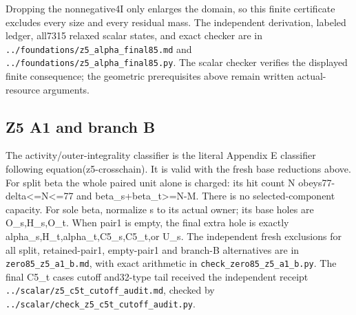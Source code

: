 \documentclass[10pt,a4paper]{article}
\theoremstyle{definition}
\begin{document}
Dropping the nonnegative4I only enlarges the domain,\allowbreak{} so this finite
certificate excludes every size and every residual mass. The independent
derivation,\allowbreak{} labeled ledger,\allowbreak{} all7315 relaxed scalar states,\allowbreak{} and exact
checker are in
\texttt{../\allowbreak{}foundations/\allowbreak{}z5\_\allowbreak{}\allowbreak{}alpha\_\allowbreak{}\allowbreak{}final85.md} and
\texttt{../\allowbreak{}foundations/\allowbreak{}z5\_\allowbreak{}\allowbreak{}alpha\_\allowbreak{}\allowbreak{}final85.py}. The
scalar checker verifies the displayed finite consequence; the geometric
prerequisites above remain written actual-resource arguments.

\hypertarget{z5-a1-and-branch-b}{%
\subsection{Z5 A1 and branch B}\label{z5-a1-and-branch-b}}

The activity/outer-integrality classifier is the literal Appendix E
classifier following equation(z5-crosschain). It is valid with the fresh
base reductions above. For split beta the whole paired unit alone is
charged: its hit count N obeys77-delta\textless=\allowbreak{}N\textless=\allowbreak{}77 and
beta\_\allowbreak{}s+\allowbreak{}beta\_\allowbreak{}t\textgreater=\allowbreak{}N-M. There is no selected-component
capacity. For sole beta,\allowbreak{} normalize s to its actual owner; its base holes
are O\_\allowbreak{}s,\allowbreak{}H\_\allowbreak{}s,\allowbreak{}O\_\allowbreak{}t. When pair1 is empty,\allowbreak{} the final extra hole is exactly
alpha\_\allowbreak{}s,\allowbreak{}H\_\allowbreak{}t,\allowbreak{}alpha\_\allowbreak{}t,\allowbreak{}C5\_\allowbreak{}s,\allowbreak{}C5\_\allowbreak{}t,\allowbreak{}or U\_\allowbreak{}s. The independent fresh
exclusions for all split,\allowbreak{} retained-pair1,\allowbreak{} empty-pair1 and branch-B
alternatives are in \texttt{zero85\_\allowbreak{}\allowbreak{}z5\_\allowbreak{}\allowbreak{}a1\_\allowbreak{}\allowbreak{}b.md},\allowbreak{} with
exact arithmetic in
\texttt{check\_\allowbreak{}\allowbreak{}zero85\_\allowbreak{}\allowbreak{}z5\_\allowbreak{}\allowbreak{}a1\_\allowbreak{}\allowbreak{}b.py}. The final C5\_\allowbreak{}t
case\textquotesingle s cutoff and32-type tail received the independent
receipt \texttt{../\allowbreak{}scalar/\allowbreak{}z5\_\allowbreak{}\allowbreak{}c5t\_\allowbreak{}\allowbreak{}cutoff\_\allowbreak{}\allowbreak{}audit.md},\allowbreak{}
checked by
\texttt{../\allowbreak{}scalar/\allowbreak{}check\_\allowbreak{}\allowbreak{}z5\_\allowbreak{}\allowbreak{}c5t\_\allowbreak{}\allowbreak{}cutoff\_\allowbreak{}\allowbreak{}audit.py}.
\end{document}

